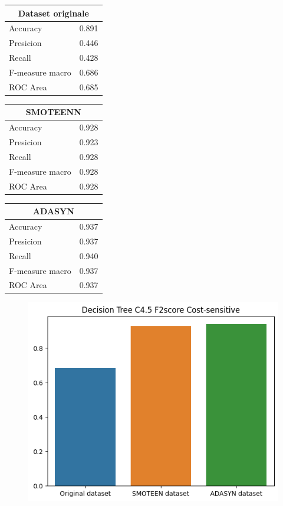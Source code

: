 \documentclass[italian,12pt,a4paper]{article}
\begin{document}
		\begin{center}
		
		\begin{table}[h]
			\footnotesize
			\begin{tabular}{|p{2cm}|c|}
				\hline
				\multicolumn{2}{|c|}{Dataset originale}\\ \hline
				Accuracy & 0.891 \\ \hline
				Presicion & 0.446 \\ \hline
				Recall & 0.428 \\ \hline
				F-measure macro & 0.686 \\ \hline
				ROC Area & 0.685 \\ \hline  
			\end{tabular}
			\hfill
			\begin{tabular}{|p{2cm}|c|}
				\hline
				\multicolumn{2}{|c|}{SMOTEENN}\\ \hline
				Accuracy & 0.928 \\ \hline
				Presicion & 0.923 \\ \hline
				Recall & 0.928 \\ \hline
				F-measure macro & 0.928 \\ \hline
				ROC Area & 0.928 \\ \hline  
			\end{tabular}
			\hfill
			\begin{tabular}{|p{2cm}|r|} \hline
				\multicolumn{2}{|c|}{ADASYN}\\ \hline
				Accuracy & 0.937 \\ \hline
				Presicion & 0.937 \\ \hline
				Recall & 0.940 \\ \hline
				F-measure macro & 0.937 \\ \hline
				ROC Area & 0.937 \\ \hline  
			\end{tabular}
		\end{table}
		\begin{figure}[h]
			\centering
			\includegraphics[scale=0.73]{DecTreeCostSens}
		\end{figure}
	\end{center}
	
\end{document}
